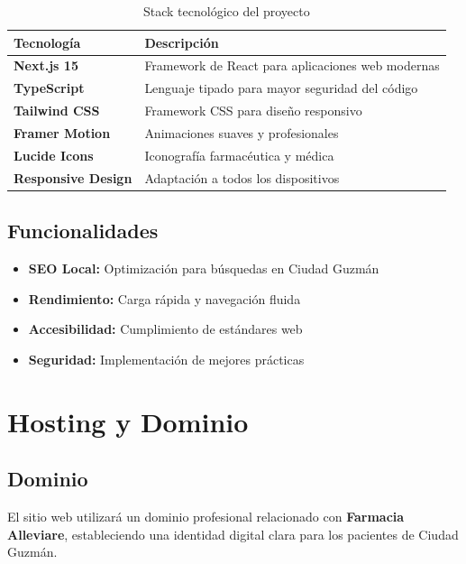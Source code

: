 \documentclass[12pt,a4paper]{article}
\begin{document}
\begin{table}[h]
\centering
\begin{tabularx}{\textwidth}{|l|X|}
\hline
\textbf{Tecnología} & \textbf{Descripción} \\
\hline
\textbf{Next.js 15} & Framework de React para aplicaciones web modernas \\
\hline
\textbf{TypeScript} & Lenguaje tipado para mayor seguridad del código \\
\hline
\textbf{Tailwind CSS} & Framework CSS para diseño responsivo \\
\hline
\textbf{Framer Motion} & Animaciones suaves y profesionales \\
\hline
\textbf{Lucide Icons} & Iconografía farmacéutica y médica \\
\hline
\textbf{Responsive Design} & Adaptación a todos los dispositivos \\
\hline
\end{tabularx}
\caption{Stack tecnológico del proyecto}
\end{table}

\subsection{Funcionalidades}

\begin{itemize}[leftmargin=*]
    \item \textbf{SEO Local:} Optimización para búsquedas en Ciudad Guzmán
    \item \textbf{Rendimiento:} Carga rápida y navegación fluida
    \item \textbf{Accesibilidad:} Cumplimiento de estándares web
    \item \textbf{Seguridad:} Implementación de mejores prácticas
\end{itemize}

\section{Hosting y Dominio}

\subsection{Dominio}
El sitio web utilizará un dominio profesional relacionado con \textbf{Farmacia Alleviare}, estableciendo una identidad digital clara para los pacientes de Ciudad Guzmán.
\end{document}
